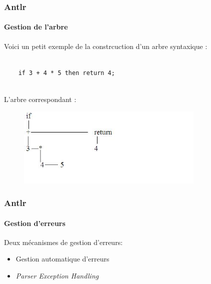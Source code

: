 \documentclass{beamer}
\begin{document}
\begin{frame}[fragile,allowframebreaks=0.98]
\frametitle{Antlr}\framesubtitle{Gestion de l'arbre}
	Voici un petit exemple de la constrcuction d'un arbre syntaxique : 
\begin{verbatim}
	
	if 3 + 4 * 5 then return 4;
	
\end{verbatim}

L'arbre correspondant :

\begin{figure}[h]
	\centering
		\includegraphics[width=0.80\textwidth]{ast.jpg}
	\label{fig:ast_process}
\end{figure}
	
\end{frame}

\begin{frame}\frametitle{Antlr}\framesubtitle{Gestion d'erreurs}
	Deux mécanismes de gestion d'erreurs:
	 \begin{itemize}
			\item Gestion automatique d'erreurs
			\item \textit{Parser Exception Handling}
		\end{itemize}

\end{frame}
\end{document}
